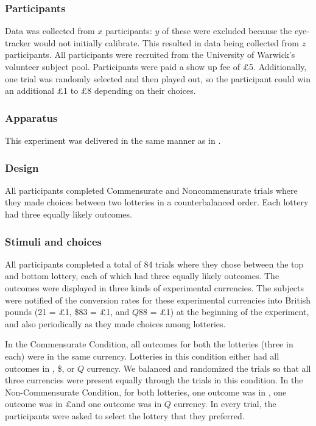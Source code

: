 \documentclass[doc, a4paper, apacite]{apa6}
\def\yenrule{\rule{1.3ex}{.1ex}}
\def\textyen{\renewcommand\stacktype{L}\stackon[.4ex]{\stackon[.65ex]{Y}{\yenrule}}{\yenrule}}
\begin{document}
\subsubsection{Participants}
Data was collected from $x$ participants: $y$ of these were excluded because the eye-tracker would not initially calibrate. This resulted in data being collected from $z$ participants. All participants were recruited from the University of Warwick's volunteer subject pool. Participants were paid a show up fee of \pounds 5. Additionally, one trial was randomly selected and then played out, so the participant could win an additional \pounds 1 to \pounds 8 depending on their choices. 

\subsubsection{Apparatus}
This experiment was delivered in the same manner as in . 

\subsubsection{Design}
All participants completed Commensurate and Noncommensurate trials where they made choices between two lotteries in a counterbalanced order. Each lottery had three equally likely outcomes.

\subsubsection{Stimuli and choices}
All participants completed a total of 84 trials where they chose between the top and bottom lottery, each of which had three equally likely outcomes. The outcomes were displayed in three kinds of experimental currencies. The subjects were notified of the conversion rates for these experimental currencies into British pounds (\textyen 21 = \pounds1, \$83 = \pounds 1, and $Q88$ = \pounds1) at the beginning of the experiment, and also periodically as they made choices among lotteries.
 
In the Commensurate Condition, all outcomes for both the lotteries (three in each) were in the same currency. Lotteries in this condition either had all outcomes in \textyen, \$, or $Q$ currency. We balanced and randomized the trials so that all three currencies were present equally through the trials in this condition. In the Non-Commensurate Condition, for both lotteries, one outcome was in \textyen, one outcome was in \pounds\space and one outcome was in $Q$ currency. In every trial, the participants were asked to select the lottery that they preferred. 
\end{document}
